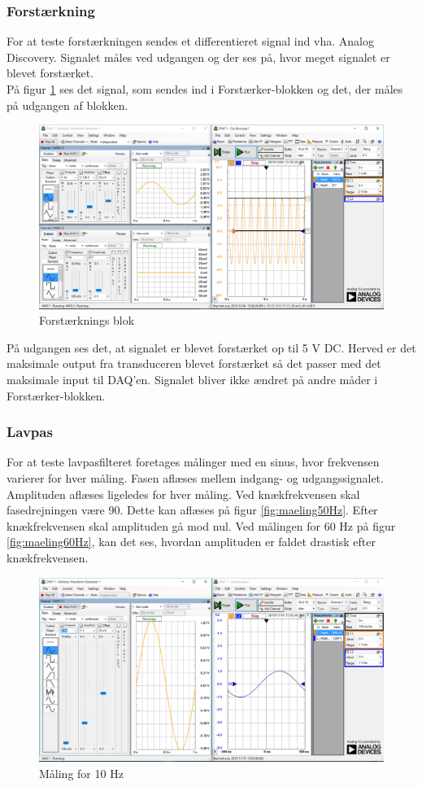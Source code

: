 \subsubsection{Forstærkning}
For at teste forstærkningen sendes et differentieret signal ind vha. Analog Discovery. Signalet måles ved udgangen og der ses på, hvor meget signalet er blevet forstærket.\\ 
På figur \ref{fig:forstaerkning} ses det signal, som sendes ind i Forstærker-blokken og det, der måles på udgangen af blokken. 
\begin{figure}[H]
	\centering
	\includegraphics[width=1.0\textwidth]{Figurer/forst_blok}
	\caption{Forstærknings blok}
	\label{fig:forstaerkning}
\end{figure}
På udgangen ses det, at signalet er blevet forstærket op til 5 V DC. Herved er det maksimale output fra transduceren blevet forstærket så det passer med det maksimale input til DAQ'en. Signalet bliver ikke ændret på andre måder i Forstærker-blokken.

\subsubsection{Lavpas}
For at teste lavpasfilteret foretages målinger med en sinus, hvor frekvensen varierer for hver måling. Fasen aflæses mellem indgang- og udgangssignalet. Amplituden aflæses ligeledes for hver måling. 
Ved knækfrekvensen skal fasedrejningen være 90\textdegree. Dette kan aflæses på figur \ref{fig:maeling50Hz}.
Efter knækfrekvensen skal amplituden gå mod nul. Ved målingen for 60 Hz på figur \ref{fig:maeling60Hz}, kan det ses, hvordan amplituden er faldet drastisk efter knækfrekvensen. 
\begin{figure}[H]
	\centering
	\includegraphics[width=1.0\textwidth]{Figurer/10Hz}
	\caption{Måling for 10 Hz}
	\label{fig:maeling10Hz}
\end{figure}

